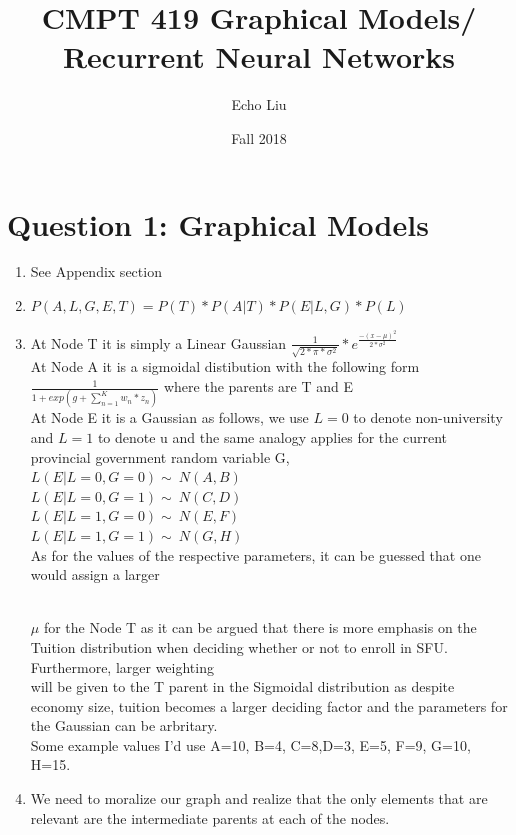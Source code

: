 \documentclass[12pt,letterpaper]{article}
\title{CMPT 419 Graphical Models/ Recurrent Neural Networks}
\author{Echo Liu}
\date{Fall 2018}
\begin{document}
\begin{titlepage}
\maketitle
\end{titlepage}

\section{Question 1: Graphical Models}
\begin{enumerate}
	\item See Appendix section

	\item $P(A,L,G,E,T) = P(T)*P(A|T)*P(E|L,G)*P(L)$

	\item At Node T it is simply a Linear Gaussian $\frac{1}{\sqrt{2*\pi*\sigma^{2}}} * e^\frac{-(x-\mu)^{2}}{2*\sigma^{2}}$
	\\ At Node A it is a sigmoidal distibution with the following form $\frac{1}{1+ exp(g+\sum_{n=1}^{K}w_{n}*z_{n})}$ where the parents are T and E
	\\ At Node E it is a Gaussian as follows, we use $L=0$ to denote non-university and $L=1$ to denote u and the same analogy applies for the current provincial government random variable G, 
	\\ $L(E|L=0,G=0) \sim\ N(A,B)$
	\\ $L(E|L=0,G=1) \sim\ N(C,D)$
	\\ $L(E|L=1,G=0) \sim\ N(E,F)$
	\\ $L(E|L=1,G=1) \sim\ N(G,H)$
	\\ As for the values of the respective parameters, it can be guessed that one would assign a larger
	
	\\ $\mu$ for the Node T as it can be argued that there is more emphasis on the Tuition distribution when deciding whether or not to enroll in SFU. Furthermore, larger weighting 
	\\ will be given to the T parent in the Sigmoidal distribution as despite economy size, tuition becomes a larger deciding factor and the parameters for the Gaussian can be arbritary. 
	\\ Some example values I'd use A=10, B=4, C=8,D=3, E=5, F=9, G=10, H=15.

	\item We need to moralize our graph and realize that the only elements that are relevant are the intermediate parents at each of the nodes.

\end{enumerate}
\end{document}

